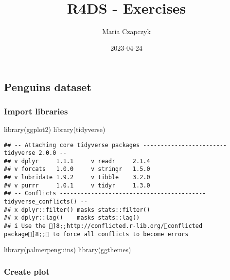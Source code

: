 \documentclass[
]{article}
\title{R4DS - Exercises}
\author{Maria Czapczyk}
\date{2023-04-24}
\newenvironment{Shaded}{\begin{snugshade}}{\end{snugshade}}
\newcommand{\FunctionTok}[1]{\textcolor[rgb]{0.00,0.00,0.00}{#1}}
\newcommand{\NormalTok}[1]{#1}
\begin{document}
\maketitle

\hypertarget{penguins-dataset}{%
\subsection{Penguins dataset}\label{penguins-dataset}}

\hypertarget{import-libraries}{%
\subsubsection{Import libraries}\label{import-libraries}}

\begin{Shaded}
\begin{Highlighting}[]
\FunctionTok{library}\NormalTok{(ggplot2)}
\FunctionTok{library}\NormalTok{(tidyverse)}
\end{Highlighting}
\end{Shaded}

\begin{verbatim}
## -- Attaching core tidyverse packages ------------------------ tidyverse 2.0.0 --
## v dplyr     1.1.1     v readr     2.1.4
## v forcats   1.0.0     v stringr   1.5.0
## v lubridate 1.9.2     v tibble    3.2.0
## v purrr     1.0.1     v tidyr     1.3.0
## -- Conflicts ------------------------------------------ tidyverse_conflicts() --
## x dplyr::filter() masks stats::filter()
## x dplyr::lag()    masks stats::lag()
## i Use the ]8;;http://conflicted.r-lib.org/conflicted package]8;; to force all conflicts to become errors
\end{verbatim}

\begin{Shaded}
\begin{Highlighting}[]
\FunctionTok{library}\NormalTok{(palmerpenguins)}
\FunctionTok{library}\NormalTok{(ggthemes)}
\end{Highlighting}
\end{Shaded}

\hypertarget{create-plot}{%
\subsubsection{Create plot}\label{create-plot}}
\end{document}
